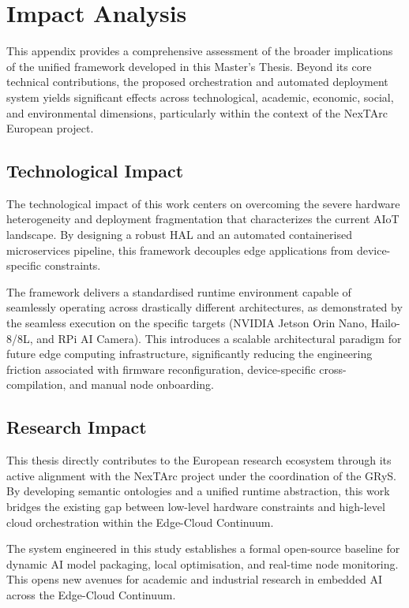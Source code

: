\chapter{Impact Analysis}\label{ap:impact}

This appendix provides a comprehensive assessment of the broader implications of the unified framework developed in this Master's Thesis. Beyond its core technical contributions, the proposed orchestration and automated deployment system yields significant effects across technological, academic, economic, social, and environmental dimensions, particularly within the context of the NexTArc European project.

\section{Technological Impact}\label{sec:impact:technological}

The technological impact of this work centers on overcoming the severe hardware heterogeneity and deployment fragmentation that characterizes the current \gls{AIoT} landscape. By designing a robust \gls{HAL} and an automated containerised microservices pipeline, this framework decouples edge applications from device-specific constraints. 

The framework delivers a standardised runtime environment capable of seamlessly operating across drastically different architectures, as demonstrated by the seamless execution on the specific targets (NVIDIA Jetson Orin Nano, Hailo-8/8L, and \gls{RPi} \gls{AI} Camera). This introduces a scalable architectural paradigm for future edge computing infrastructure, significantly reducing the engineering friction associated with firmware reconfiguration, device-specific cross-compilation, and manual node onboarding.

\section{Research Impact}\label{sec:impact:research}

This thesis directly contributes to the European research ecosystem through its active alignment with the NexTArc project under the coordination of the \gls{GRyS}. By developing semantic ontologies and a unified runtime abstraction, this work bridges the existing gap between low-level hardware constraints and high-level cloud orchestration within the Edge-Cloud Continuum. 

The system engineered in this study establishes a formal open-source baseline for dynamic \gls{AI} model packaging, local optimisation, and real-time node monitoring. This opens new avenues for academic and industrial research in embedded \gls{AI} across the Edge-Cloud Continuum.

